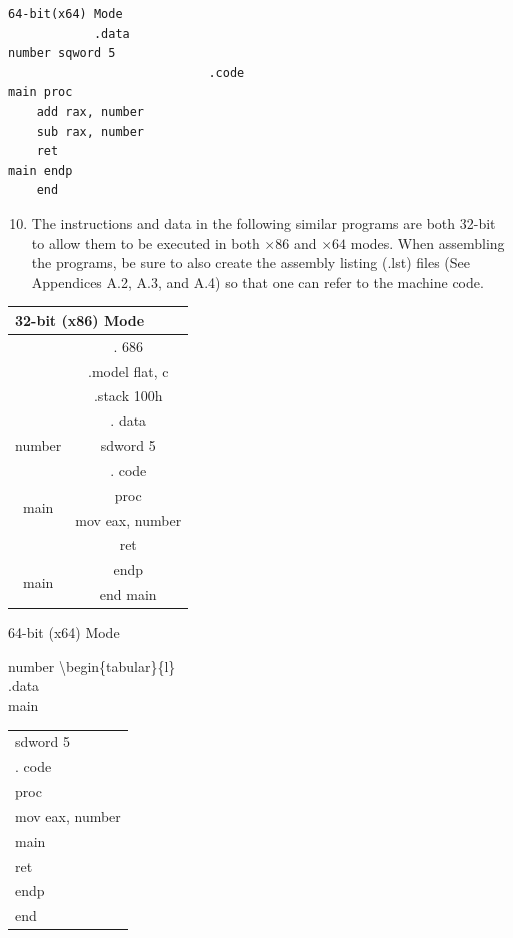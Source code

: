 \documentclass[10pt]{book}
\begin{document}
\begin{center}
\begin{center}
\begin{center}
\begin{center}
\begin{center}
\begin{verbatim}
64-bit(x64) Mode
            .data
number sqword 5
                            .code
main proc
    add rax, number
    sub rax, number
    ret
main endp
    end
\end{verbatim}

\begin{enumerate}
  \setcounter{enumi}{9}
  \item The instructions and data in the following similar programs are both 32-bit to allow them to be executed in both $\times 86$ and $\times 64$ modes. When assembling the programs, be sure to also create the assembly listing (.lst) files (See Appendices A.2, A.3, and A.4) so that one can refer to the machine code.
\end{enumerate}


\begin{center}
\begin{tabular}{|c|c|}
\hline
\multicolumn{2}{|l|}{32-bit (x86) Mode} \\
\hline
 & . 686 \\
\hline
 & .model flat, c \\
\hline
 & .stack 100h \\
\hline
 & . data \\
\hline
number & sdword 5 \\
\hline
 & . code \\
\hline
\multirow[t]{2}{*}{main} & proc \\
\hline
 & mov eax, number \\
\hline
 & ret \\
\hline
\multirow[t]{2}{*}{main} & endp \\
\hline
 & end main \\
\hline
\end{tabular}
\end{center}

64-bit (x64) Mode

number \textbackslash begin\{tabular\}\{l\}\\
.data \\


main \begin{tabular}{l}
sdword 5 \\
. code \\
proc \\
mov eax, number \\
main \\
ret \\
endp \\
end \\
\end{tabular}


\end{center}
\end{center}
\end{center}
\end{center}
\end{center}
\end{document}

